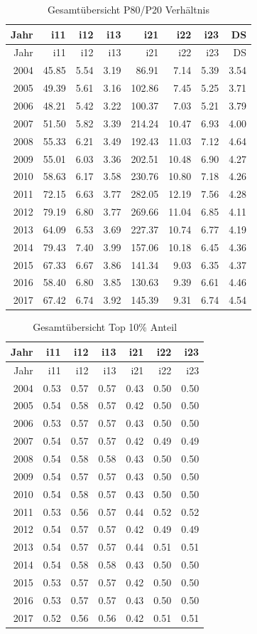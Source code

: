 \documentclass[ngerman,]{article}
\begin{document}
\begin{longtable}[]{@{}rrrrrrrr@{}}
\caption{Gesamtübersicht P80/P20 Verhältnis}\tabularnewline
\toprule
Jahr & i11 & i12 & i13 & i21 & i22 & i23 & DS\tabularnewline
\midrule
\endfirsthead
\toprule
Jahr & i11 & i12 & i13 & i21 & i22 & i23 & DS\tabularnewline
\midrule
\endhead
2004 & 45.85 & 5.54 & 3.19 & 86.91 & 7.14 & 5.39 & 3.54\tabularnewline
2005 & 49.39 & 5.61 & 3.16 & 102.86 & 7.45 & 5.25 & 3.71\tabularnewline
2006 & 48.21 & 5.42 & 3.22 & 100.37 & 7.03 & 5.21 & 3.79\tabularnewline
2007 & 51.50 & 5.82 & 3.39 & 214.24 & 10.47 & 6.93 & 4.00\tabularnewline
2008 & 55.33 & 6.21 & 3.49 & 192.43 & 11.03 & 7.12 & 4.64\tabularnewline
2009 & 55.01 & 6.03 & 3.36 & 202.51 & 10.48 & 6.90 & 4.27\tabularnewline
2010 & 58.63 & 6.17 & 3.58 & 230.76 & 10.80 & 7.18 & 4.26\tabularnewline
2011 & 72.15 & 6.63 & 3.77 & 282.05 & 12.19 & 7.56 & 4.28\tabularnewline
2012 & 79.19 & 6.80 & 3.77 & 269.66 & 11.04 & 6.85 & 4.11\tabularnewline
2013 & 64.09 & 6.53 & 3.69 & 227.37 & 10.74 & 6.77 & 4.19\tabularnewline
2014 & 79.43 & 7.40 & 3.99 & 157.06 & 10.18 & 6.45 & 4.36\tabularnewline
2015 & 67.33 & 6.67 & 3.86 & 141.34 & 9.03 & 6.35 & 4.37\tabularnewline
2016 & 58.40 & 6.80 & 3.85 & 130.63 & 9.39 & 6.61 & 4.46\tabularnewline
2017 & 67.42 & 6.74 & 3.92 & 145.39 & 9.31 & 6.74 & 4.54\tabularnewline
\bottomrule
\end{longtable}

\begin{longtable}[]{@{}rrrrrrr@{}}
\caption{Gesamtübersicht Top 10\% Anteil}\tabularnewline
\toprule
Jahr & i11 & i12 & i13 & i21 & i22 & i23\tabularnewline
\midrule
\endfirsthead
\toprule
Jahr & i11 & i12 & i13 & i21 & i22 & i23\tabularnewline
\midrule
\endhead
2004 & 0.53 & 0.57 & 0.57 & 0.43 & 0.50 & 0.50\tabularnewline
2005 & 0.54 & 0.58 & 0.57 & 0.42 & 0.50 & 0.50\tabularnewline
2006 & 0.53 & 0.57 & 0.57 & 0.43 & 0.50 & 0.50\tabularnewline
2007 & 0.54 & 0.57 & 0.57 & 0.42 & 0.49 & 0.49\tabularnewline
2008 & 0.54 & 0.58 & 0.58 & 0.43 & 0.50 & 0.50\tabularnewline
2009 & 0.54 & 0.57 & 0.57 & 0.43 & 0.50 & 0.50\tabularnewline
2010 & 0.54 & 0.58 & 0.57 & 0.43 & 0.50 & 0.50\tabularnewline
2011 & 0.53 & 0.56 & 0.57 & 0.44 & 0.52 & 0.52\tabularnewline
2012 & 0.54 & 0.57 & 0.57 & 0.42 & 0.49 & 0.49\tabularnewline
2013 & 0.54 & 0.57 & 0.57 & 0.44 & 0.51 & 0.51\tabularnewline
2014 & 0.54 & 0.58 & 0.58 & 0.43 & 0.50 & 0.50\tabularnewline
2015 & 0.53 & 0.57 & 0.57 & 0.42 & 0.50 & 0.50\tabularnewline
2016 & 0.53 & 0.57 & 0.57 & 0.43 & 0.50 & 0.50\tabularnewline
2017 & 0.52 & 0.56 & 0.56 & 0.42 & 0.51 & 0.51\tabularnewline
\bottomrule
\end{longtable}
\end{document}
